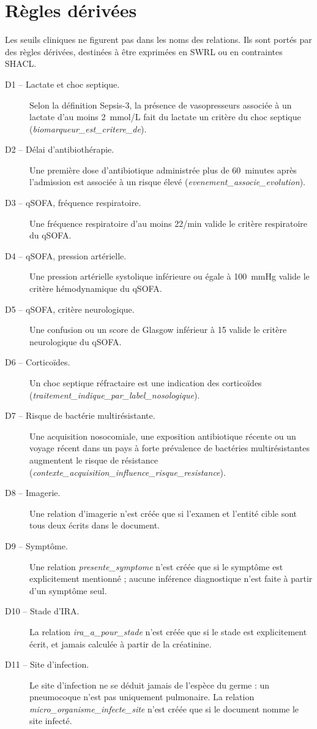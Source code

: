 \section{Règles dérivées}\label{annexe:regles-derivees}

Les seuils cliniques ne figurent pas dans les noms des relations. Ils sont portés par des règles dérivées, destinées à être exprimées en SWRL ou en contraintes SHACL.

\begin{description}
  \item[D1 -- Lactate et choc septique.] Selon la définition Sepsis-3, la présence de vasopresseurs associée à un lactate d'au moins 2~mmol/L fait du lactate un critère du choc septique (\emph{biomarqueur\_est\_critere\_de}).
  \item[D2 -- Délai d'antibiothérapie.] Une première dose d'antibiotique administrée plus de 60~minutes après l'admission est associée à un risque élevé (\emph{evenement\_associe\_evolution}).
  \item[D3 -- qSOFA, fréquence respiratoire.] Une fréquence respiratoire d'au moins 22/min valide le critère respiratoire du qSOFA.
  \item[D4 -- qSOFA, pression artérielle.] Une pression artérielle systolique inférieure ou égale à 100~mmHg valide le critère hémodynamique du qSOFA.
  \item[D5 -- qSOFA, critère neurologique.] Une confusion ou un score de Glasgow inférieur à 15 valide le critère neurologique du qSOFA.
  \item[D6 -- Corticoïdes.] Un choc septique réfractaire est une indication des corticoïdes (\emph{traitement\_indique\_par\_label\_nosologique}).
  \item[D7 -- Risque de bactérie multirésistante.] Une acquisition nosocomiale, une exposition antibiotique récente ou un voyage récent dans un pays à forte prévalence de bactéries multirésistantes augmentent le risque de résistance (\emph{contexte\_acquisition\_influence\_risque\_resistance}).
  \item[D8 -- Imagerie.] Une relation d'imagerie n'est créée que si l'examen et l'entité cible sont tous deux écrits dans le document.
  \item[D9 -- Symptôme.] Une relation \emph{presente\_symptome} n'est créée que si le symptôme est explicitement mentionné ; aucune inférence diagnostique n'est faite à partir d'un symptôme seul.
  \item[D10 -- Stade d'IRA.] La relation \emph{ira\_a\_pour\_stade} n'est créée que si le stade est explicitement écrit, et jamais calculée à partir de la créatinine.
  \item[D11 -- Site d'infection.] Le site d'infection ne se déduit jamais de l'espèce du germe : un pneumocoque n'est pas uniquement pulmonaire. La relation \emph{micro\_organisme\_infecte\_site} n'est créée que si le document nomme le site infecté.
\end{description}
